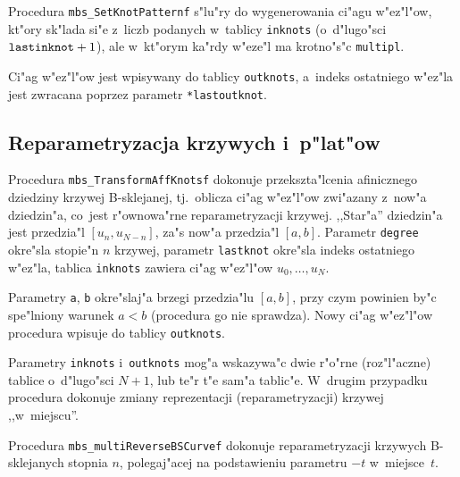\vspace{\bigskipamount}
Procedura \texttt{mbs\_SetKnotPatternf} s"lu"ry do wygenerowania ci"agu
w"ez"l"ow, kt"ory sk"lada si"e z~liczb podanych w~tablicy \texttt{inknots}
(o~d"lugo"sci $\mathord{\mbox{\texttt{lastinknot}}}+1$),
ale w~kt"orym ka"rdy w"eze"l ma krotno"s"c \texttt{multipl}.

Ci"ag w"ez"l"ow
jest wpisywany do tablicy \texttt{outknots}, a~indeks ostatniego w"ez"la
jest zwracana poprzez parametr \texttt{*lastoutknot}.


\newpage
\subsection{Reparametryzacja krzywych i~p"lat"ow}

\begin{sloppypar}
\hspace*{\parindent}Procedura \texttt{mbs\_TransformAffKnotsf} dokonuje
przekszta"lcenia
afinicznego dziedziny krzywej B-sklejanej, tj.\ oblicza ci"ag w"ez"l"ow
zwi"azany z~now"a dziedzin"a, co~jest r"ownowa"rne reparametryzacji krzywej.
,,Star"a'' dziedzin"a jest przedzia"l
$[u_n,u_{N-n}]$, za"s now"a przedzia"l $[a,b]$. Parametr \texttt{degree}
okre"sla stopie"n $n$ krzywej, parametr \texttt{lastknot} okre"sla indeks
ostatniego w"ez"la, tablica \texttt{inknots} zawiera ci"ag w"ez"l"ow
$u_0,\ldots,u_N$.
\end{sloppypar}

Parametry \texttt{a}, \texttt{b} okre"slaj"a brzegi przedzia"lu $[a,b]$,
przy czym powinien by"c spe"lniony warunek $a<b$ (procedura go nie sprawdza).
Nowy ci"ag w"ez"l"ow procedura wpisuje do tablicy \texttt{outknots}.

Parametry \texttt{inknots} i~\texttt{outknots} mog"a wskazywa"c dwie r"o"rne
(roz"l"aczne) tablice o~d"lugo"sci $N+1$, lub te"r t"e sam"a tablic"e.
W~drugim przypadku procedura dokonuje zmiany reprezentacji
(reparametryzacji) krzywej ,,w~miejscu''.

\vspace{\bigskipamount}
Procedura \texttt{mbs\_multiReverseBSCurvef} dokonuje reparametryzacji
krzywych \mbox{B-sklejanych} stopnia $n$, polegaj"acej na podstawieniu
parametru $-t$ w~miejsce~$t$.

